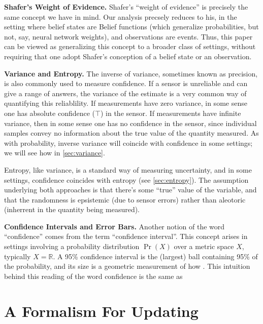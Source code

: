 \documentclass{uai2023} %
\begin{document}
{	\textbf{Shafer's Weight of Evidence.}
	Shafer's ``weight of evidence'' is precisely the same concept we have in mind.
	Our analysis precsely reduces to his, in the setting where belief states are Belief functions (which generalize probabilities, but not, say, neural network weights), and observations are events.
	Thus, this paper can be viewed as generalizing this concept to a broader class of settings, without requiring that one adopt Shafer's conception of a belief state or an observation.


	\textbf{Variance and Entropy.}
	The inverse of variance, sometimes known as precision,
		is also commonly used to measure confidence.
	If a sensor is unreliable and can give a range of answers, the variance of the estimate is a very common way of quantifying this reliablility.
	If measurements have zero variance, in some sense one has absolute confidence ($\top$) in the sensor. If measurements have infinite variance, then in some sense one has no confidence in the sensor, since individual samples convey no information about the true value of the quantity measured.
	As with probability, inverse variance will coincide with confidence in some settings; we will see how in \cref{sec:variance}.

	Entropy, like variance, is a standard way of measuring uncertainty, and in some settings, confidence coincides with entropy (see \cref{sec:entropy}).
	The assumption underlying both approaches is that there's some ``true'' value of the variable, and that the randomness is epsistemic (due to sensor errors) rather than aleotoric (inherrent in the quantity being measured).

	\textbf{Confidence Intervals and Error Bars.}
	Another notion of the word ``confidence'' comes from the term ``confidence interval''.
	This concept arises in settings involving a probability distribution $\Pr(X)$ over a metric space $X$, typically $X = \mathbb R$.
	A 95\% confidence interval is the (largest) ball containing 95\% of the probability, and its size is a geometric measurement of how .
	This intuition behind this reading of the word confidence is the same as
}


\section{A Formalism For Updating}
%
\end{document}
